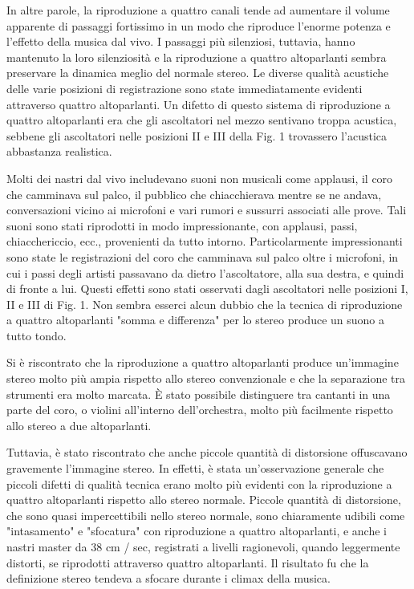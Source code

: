 \documentclass[11pt]{article}
\begin{document}
\begin{multicols*}{2}
In altre parole, la riproduzione a quattro canali tende ad aumentare il volume apparente di passaggi fortissimo in un modo che riproduce l'enorme potenza e l'effetto della musica dal vivo. I passaggi più silenziosi, tuttavia, hanno mantenuto la loro silenziosità e la riproduzione a quattro altoparlanti sembra preservare la dinamica meglio del normale stereo. Le diverse qualità acustiche delle varie posizioni di registrazione sono state immediatamente evidenti attraverso quattro altoparlanti. Un difetto di questo sistema di riproduzione a quattro altoparlanti era che gli ascoltatori nel mezzo sentivano troppa acustica, sebbene gli ascoltatori nelle posizioni II e III della Fig. 1 trovassero l'acustica abbastanza realistica.

Molti dei nastri dal vivo includevano suoni non musicali come applausi, il coro che camminava sul palco, il pubblico che chiacchierava mentre se ne andava, conversazioni vicino ai microfoni e vari rumori e sussurri associati alle prove. Tali suoni sono stati riprodotti in modo impressionante, con applausi, passi, chiacchericcio, ecc., provenienti da tutto intorno. Particolarmente impressionanti sono state le registrazioni del coro che camminava sul palco oltre i microfoni, in cui i passi degli artisti passavano da dietro l'ascoltatore, alla sua destra, e quindi di fronte a lui. Questi effetti sono stati osservati dagli ascoltatori nelle posizioni I, II e III di Fig. 1. Non sembra esserci alcun dubbio che la tecnica di riproduzione a quattro altoparlanti "somma e differenza" per lo stereo produce un suono a tutto tondo.

Si è riscontrato che la riproduzione a quattro altoparlanti produce un'immagine stereo molto più ampia rispetto allo stereo convenzionale e che la separazione tra strumenti era molto marcata. È stato possibile distinguere tra cantanti in una parte del coro, o violini all'interno dell'orchestra, molto più facilmente rispetto allo stereo a due altoparlanti.

Tuttavia, è stato riscontrato che anche piccole quantità di distorsione offuscavano gravemente l'immagine stereo. In effetti, è stata un'osservazione generale che piccoli difetti di qualità tecnica erano molto più evidenti con la riproduzione a quattro altoparlanti rispetto allo stereo normale. Piccole quantità di distorsione, che sono quasi impercettibili nello stereo normale, sono chiaramente udibili come "intasamento" e "sfocatura" con riproduzione a quattro altoparlanti, e anche i nastri master da 38 cm / sec, registrati a livelli ragionevoli, quando leggermente distorti, se riprodotti attraverso quattro altoparlanti. Il risultato fu che la definizione stereo tendeva a sfocare durante i climax della musica.


\end{multicols*}
\end{document}
